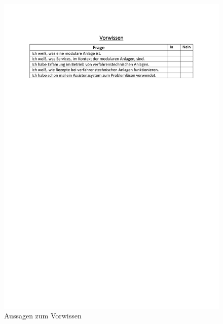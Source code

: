 \begin{figure}[htbp]
\centering
\includegraphics[scale=0.8]{DA_files/Bilder/Anhang/Fragebogen-Vorwissen.pdf}
\caption{Aussagen zum Vorwissen}
\end{figure}

